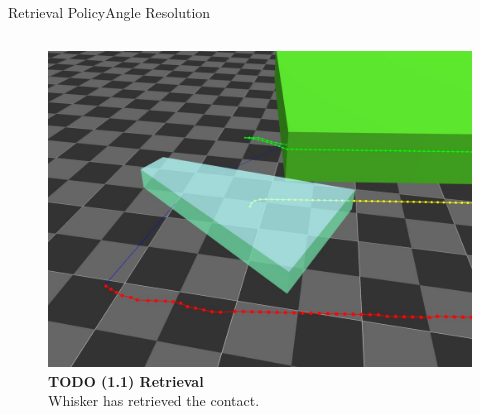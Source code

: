 \documentclass[AIRbeamer
,optEnglish
,optBiber
,optBibstyleAlphabetic
,optBeamerClassicFormat%
]{AIRlatex}
\begin{document}
    \begin{frame}[c]{Retrieval Policy}{Angle Resolution}
        \begin{columns}[T,onlytextwidth]
            \begin{column}[T]{0.48\textwidth}
                \begin{figure}[H]
                    \centering
                    \captionsetup{justification=centering}
                    \includegraphics[width=\textwidth]{figures/retrieval/retrieval}
                    \caption{\textbf{\alert{TODO} (1.1) Retrieval}\\Whisker has retrieved the contact.}
                \end{figure}


\end{column}
\end{columns}
\end{frame}
\end{document}
